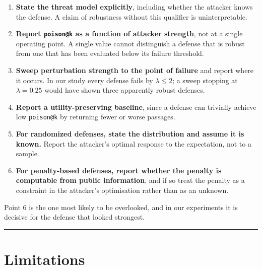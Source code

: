 \documentclass[review,3p,times]{elsarticle}
\providecommand{\tightlist}{%
  \setlength{\itemsep}{0pt}\setlength{\parskip}{0pt}}
\begin{document}
\begin{enumerate}
\def\labelenumi{\arabic{enumi}.}
\tightlist
\item
  \textbf{State the threat model explicitly}, including whether the attacker knows the defense. A claim of robustness without this qualifier is uninterpretable.
\item
  \textbf{Report \texttt{poison@k} as a function of attacker strength}, not at a single operating point. A single value cannot distinguish a defense that is robust from one that has been evaluated below its failure threshold.
\item
  \textbf{Sweep perturbation strength to the point of failure} and report where it occurs. In our study every defense fails by \(\lambda \le 2\); a sweep stopping at \(\lambda = 0.25\) would have shown three apparently robust defenses.
\item
  \textbf{Report a utility-preserving baseline}, since a defense can trivially achieve low \texttt{poison@k} by returning fewer or worse passages.
\item
  \textbf{For randomized defenses, state the distribution and assume it is known.} Report the attacker's optimal response to the expectation, not to a sample.
\item
  \textbf{For penalty-based defenses, report whether the penalty is computable from public information}, and if so treat the penalty as a constraint in the attacker's optimisation rather than as an unknown.
\end{enumerate}

Point 6 is the one most likely to be overlooked, and in our experiments it is decisive for the defense that looked strongest.

\begin{center}\rule{0.5\linewidth}{0.5pt}\end{center}

\section{Limitations}\label{limitations}
\end{document}
